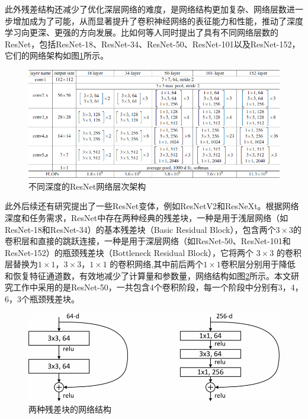 \documentclass[lang=chs, degree=master, blindreview=false, adobe=false]{yanputhesis}
\begin{document}
此外残差结构还减少了优化深层网络的难度，是网络结构更加复杂、网络层数进一步增加成为了可能，从而显著提升了卷积神经网络的表征能力和性能，推动了深度学习向更深、更强的方向发展。比如何等人同时提出了具有不同网络层数的ResNet，包括ResNet-18、ResNet-34、ResNet-50、ResNet-101以及ResNet-152，它们的网络架构如图\ref{fig:resnet}所示。
\begin{figure}[htb]
  \centering
  \includegraphics[scale=0.55]{images/resnet.png}
  \caption{
    不同深度的ResNet网络层次架构\cite{He2015ResNet}
  }
  \label{fig:resnet}
\end{figure}
此外后续还有研究提出了一些ResNet变体，例如ResNetV2\cite{2019resnetV2}和ResNeXt\cite{xie2017ResNeXt}。根据网络深度和任务需求，ResNet中存在两种经典的残差块，一种是用于浅层网络（如ResNet-18和ResNet-34）的基本残差块（Basic Residual Block），包含两个$ 3\times3 $的卷积层和直接的跳跃连接，一种是用于深层网络（如ResNet-50、ResNet-101和ResNet-152）的瓶颈残差块（Bottleneck Residual Block），它将两个 $ 3\times3 $ 的卷积层替换为$1 \times 1$，$3 \times 3$，$1 \times 1$ 的卷积网络,其中前后两个$1 \times 1$卷积层分别用于降低和恢复特征通道数，有效地减少了计算量和参数量，网络结构如图\ref{fig:resblock}所示。本文研究工作中采用的是ResNet-50，一共包含4个卷积阶段，每一个阶段中分别有3，4，6，3个瓶颈残差块。


\begin{figure}[htb]
  \centering
  \includegraphics[scale=0.55]{images/res-block.png}
  \caption{
    两种残差块的网络结构\cite{He2015ResNet}
  }
  \label{fig:resblock}
\end{figure}
\end{document}
